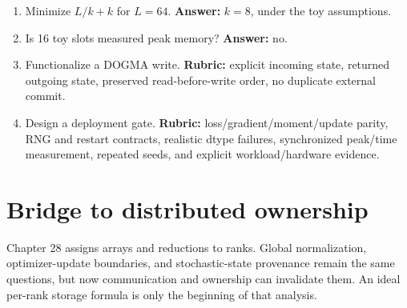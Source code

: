 \begin{enumerate}
recomputed values or equal derivatives.
\item Minimize $L/k+k$ for $L=64$. \textbf{Answer:} $k=8$, under the toy assumptions.
\item Is 16 toy slots measured peak memory? \textbf{Answer:} no.
\item Functionalize a DOGMA write. \textbf{Rubric:} explicit incoming state,
returned outgoing state, preserved read-before-write order, no duplicate external commit.
\item Design a deployment gate. \textbf{Rubric:} loss/gradient/moment/update parity,
RNG and restart contracts, realistic dtype failures, synchronized peak/time
measurement, repeated seeds, and explicit workload/hardware evidence.
\end{enumerate}

\section{Bridge to distributed ownership}
Chapter 28 assigns arrays and reductions to ranks. Global normalization,
optimizer-update boundaries, and stochastic-state provenance remain the same
questions, but now communication and ownership can invalidate them. An ideal
per-rank storage formula is only the beginning of that analysis.
